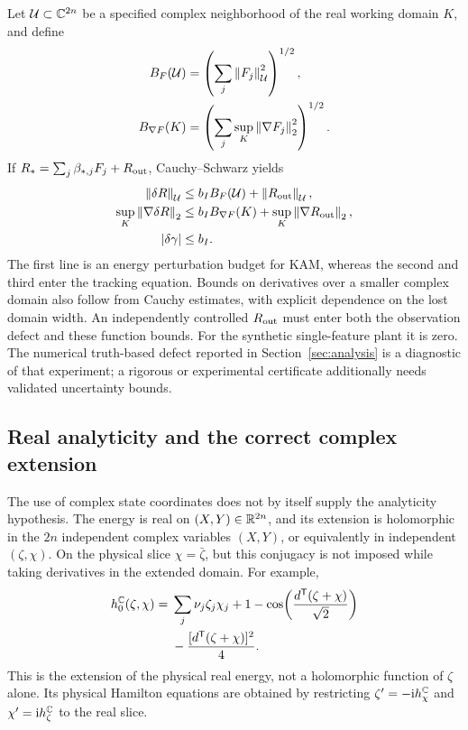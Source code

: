 Let $\mathcal U\subset\mathbb C^{2n}$ be a specified complex neighborhood of the real working domain $K$, and define
\begin{equation}\label{kam:feature-bounds}
\begin{aligned}
 B_F(\mathcal U)&=\left(\sum_j\left\lVert F_j\right\rVert_{\mathcal U}^{2}\right)^{1/2},\\
 B_{\nabla F}(K)&=\left(\sum_j\sup_K\left\lVert\nabla F_j\right\rVert_2^2\right)^{1/2}.
\end{aligned}
\end{equation}
If $R_*=\sum_j\beta_{*,j}F_j+R_{\rm out}$, Cauchy--Schwarz yields
\begin{equation}\label{kam:analytic-error}
\begin{aligned}
 \left\lVert\delta R\right\rVert_{\mathcal U}
    &\le b_I B_F(\mathcal U)+\left\lVert R_{\rm out}\right\rVert_{\mathcal U},\\
 \sup_K\left\lVert\nabla\delta R\right\rVert_2
    &\le b_I B_{\nabla F}(K)+\sup_K\left\lVert\nabla R_{\rm out}\right\rVert_2,\\
 |\delta\gamma|&\le b_I.
\end{aligned}
\end{equation}
The first line is an energy perturbation budget for KAM, whereas the second and third enter the tracking equation. Bounds on derivatives over a smaller complex domain also follow from Cauchy estimates, with explicit dependence on the lost domain width. An independently controlled $R_{\rm out}$ must enter both the observation defect and these function bounds. For the synthetic single-feature plant it is zero. The numerical truth-based defect reported in Section~\ref{sec:analysis} is a diagnostic of that experiment; a rigorous or experimental certificate additionally needs validated uncertainty bounds.

\subsection{Real analyticity and the correct complex extension}
\label{kam:analyticity}

The use of complex state coordinates does not by itself supply the analyticity hypothesis. The energy is real on $(X,Y)\in\mathbb R^{2n}$, and its extension is holomorphic in the $2n$ independent complex variables $(X,Y)$, or equivalently in independent $(\zeta,\chi)$. On the physical slice $\chi=\bar\zeta$, but this conjugacy is not imposed while taking derivatives in the extended domain. For example,
\begin{equation}\label{kam:complex-energy}
\begin{aligned}
 h_0^{\mathbb C}(\zeta,\chi)
  ={}&\sum_j\nu_j\zeta_j\chi_j
      +1-\cos\!\left(\frac{d^{\mathsf T}(\zeta+\chi)}{\sqrt2}\right)\\
     &-\frac{[d^{\mathsf T}(\zeta+\chi)]^2}{4}.
\end{aligned}
\end{equation}
This is the extension of the physical real energy, not a holomorphic function of $\zeta$ alone. Its physical Hamilton equations are obtained by restricting
$\zeta'=-\mathrm i h_\chi^{\mathbb C}$ and
$\chi'=\mathrm i h_\zeta^{\mathbb C}$ to the real slice.

